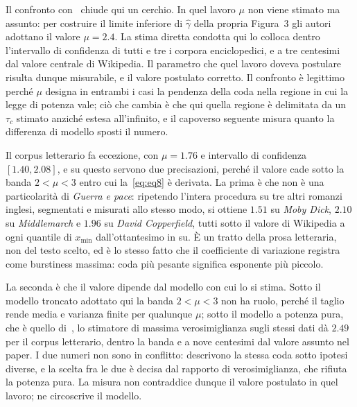 Il confronto con~\cite{altmann2012} chiude qui un cerchio. In quel lavoro $\mu$
non viene stimato ma assunto: per costruire il limite inferiore di $\hat\gamma$
della propria Figura~3 gli autori adottano il valore $\mu = 2.4$. La stima
diretta condotta qui lo colloca dentro l'intervallo di confidenza di tutti e tre
i corpora enciclopedici, e a tre centesimi dal valore centrale di Wikipedia. Il
parametro che quel lavoro doveva postulare risulta dunque misurabile, e il
valore postulato corretto. Il confronto è legittimo perché $\mu$ designa in
entrambi i casi la pendenza della coda nella regione in cui la legge di potenza
vale; ciò che cambia è che qui quella regione è delimitata da un $\tau_c$
stimato anziché estesa all'infinito, e il capoverso seguente misura quanto la
differenza di modello sposti il numero.

Il corpus letterario fa eccezione, con $\mu = 1.76$ e intervallo di confidenza
$[1.40, 2.08]$, e su questo servono due precisazioni, perché il valore cade
sotto la banda $2 < \mu < 3$ entro cui la~\eqref{eq:eq8} è derivata. La prima
è che non è una particolarità di \emph{Guerra e pace}: ripetendo l'intera
procedura su tre altri romanzi inglesi, segmentati e misurati allo stesso
modo, si ottiene $1.51$ su \emph{Moby Dick}, $2.10$ su \emph{Middlemarch} e
$1.96$ su \emph{David Copperfield}, tutti sotto il valore di Wikipedia a ogni
quantile di $x_{\min}$ dall'ottantesimo in su. È un tratto della prosa
letteraria, non del testo scelto, ed è lo stesso fatto che il coefficiente di
variazione registra come burstiness massima: coda più pesante significa
esponente più piccolo.

La seconda è che il valore dipende dal modello con cui lo si stima. Sotto il
modello troncato adottato qui la banda $2 < \mu < 3$ non ha ruolo, perché il
taglio rende media e varianza finite per qualunque $\mu$; sotto il modello a
potenza pura, che è quello di~\cite{altmann2012}, lo stimatore di massima
verosimiglianza sugli stessi dati dà $2.49$ per il corpus letterario, dentro la
banda e a nove centesimi dal valore assunto nel paper. I due numeri non sono in
conflitto: descrivono la stessa coda sotto ipotesi diverse, e la scelta fra le
due è decisa dal rapporto di verosimiglianza, che rifiuta la potenza pura. La
misura non contraddice dunque il valore postulato in quel lavoro; ne circoscrive
il modello.

